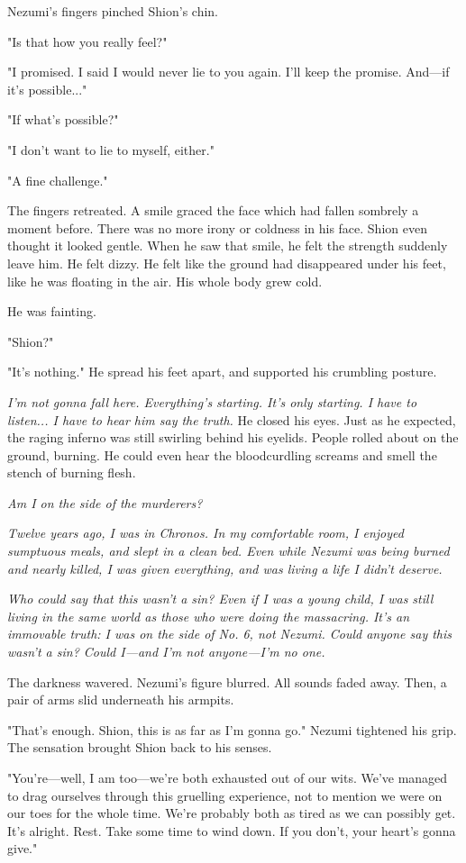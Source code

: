 Nezumi's fingers pinched Shion's chin.

"Is that how you really feel?"

"I promised. I said I would never lie to you again. I'll keep the
promise. And---if it's possible..."

"If what's possible?"

"I don't want to lie to myself, either."

"A fine challenge."

The fingers retreated. A smile graced the face which had fallen sombrely
a moment before. There was no more irony or coldness in his face. Shion
even thought it looked gentle. When he saw that smile, he felt the
strength suddenly leave him. He felt dizzy. He felt like the ground had
disappeared under his feet, like he was floating in the air. His whole
body grew cold.

He was fainting.

"Shion?"

"It's nothing." He spread his feet apart, and supported his crumbling
posture.

\emph{I'm not gonna fall here. Everything's starting. It's only starting. I
have to listen... I have to hear him say the truth.} He closed his eyes.
Just as he expected, the raging inferno was still swirling behind his
eyelids. People rolled about on the ground, burning. He could even hear
the bloodcurdling screams and smell the stench of burning flesh.

\emph{Am I on the side of the murderers?}

\emph{Twelve years ago, I was in Chronos. In my comfortable room, I enjoyed
sumptuous meals, and slept in a clean bed. Even while Nezumi was being
burned and nearly killed, I was given everything, and was living a life
I didn't deserve.}

\emph{Who could say that this wasn't a sin? Even if I was a young child, I was
still living in the same world as those who were doing the massacring.
It's an immovable truth: I was on the side of No. 6, not Nezumi. Could
anyone say this wasn't a sin? Could I---and I'm not anyone---I'm no one.}

The darkness wavered. Nezumi's figure blurred. All sounds faded away.
Then, a pair of arms slid underneath his armpits.

"That's enough. Shion, this is as far as I'm gonna go." Nezumi tightened
his grip. The sensation brought Shion back to his senses.

"You're---well, I am too---we're both exhausted out of our wits. We've
managed to drag ourselves through this gruelling experience, not to
mention we were on our toes for the whole time. We're probably both as
tired as we can possibly get. It's alright. Rest. Take some time to wind
down. If you don't, your heart's gonna give."

